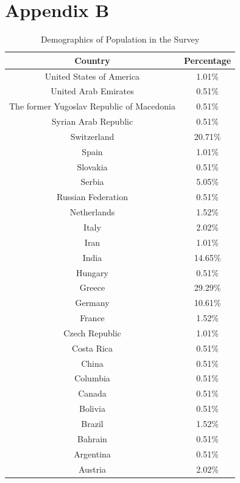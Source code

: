 \chapter{Appendix B}

\begin{table}[h!]
  \centering
  \caption{Demographics of Population in the Survey}
  \label{tab:demo}
  \begin{tabular}{cc}
    \toprule
     Country&Percentage\\
    \midrule
United States of America&1.01\%\\
United Arab Emirates&0.51\%\\
The former Yugoslav Republic of Macedonia&0.51\%\\
Syrian Arab Republic	&0.51\%\\
Switzerland&20.71\%\\
Spain	&1.01\%\\
Slovakia	&0.51\%\\
Serbia&	5.05\%\\
Russian Federation&	0.51\%\\
Netherlands	&1.52\%\\
Italy	&2.02\%\\
Iran&1.01\%\\
India	&14.65\%\\
Hungary	&0.51\%\\
Greece	&29.29\%\\
Germany	&10.61\%\\
France	&1.52\%\\
Czech Republic	&1.01\%\\
Costa Rica	&0.51\%\\
China	&0.51\%\\
Columbia	&0.51\%\\
Canada	&0.51\%\\
Bolivia	&0.51\%\\
Brazil	&1.52\%\\
Bahrain	&0.51\%\\
Argentina	&0.51\%\\
Austria & 2.02\%\\
    \bottomrule
  \end{tabular}
\end{table}


